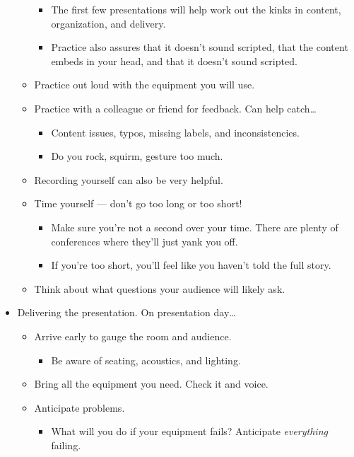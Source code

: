 \documentclass[../notes.tex]{subfiles}
\begin{document}
\begin{itemize}
\begin{itemize}
\begin{itemize}
            \item The first few presentations will help work out the kinks in content, organization, and delivery.
            \item Practice also assures that it doesn't sound scripted, that the content embeds in your head, and that it doesn't sound scripted.
        \end{itemize}
        \item Practice out loud with the equipment you will use.
        \item Practice with a colleague or friend for feedback. Can help catch\dots
        \begin{itemize}
            \item Content issues, typos, missing labels, and inconsistencies.
            \item Do you rock, squirm, gesture too much.
        \end{itemize}
        \item Recording yourself can also be very helpful.
        \item Time yourself --- don't go too long or too short!
        \begin{itemize}
            \item Make sure you're not a second over your time. There are plenty of conferences where they'll just yank you off.
            \item If you're too short, you'll feel like you haven't told the full story.
        \end{itemize}
        \item Think about what questions your audience will likely ask.
    \end{itemize}
    \item Delivering the presentation. On presentation day\dots
    \begin{itemize}
        \item Arrive early to gauge the room and audience.
        \begin{itemize}
            \item Be aware of seating, acoustics, and lighting.
        \end{itemize}
        \item Bring all the equipment you need. Check it and voice.
        \item Anticipate problems.
        \begin{itemize}
            \item What will you do if your equipment fails? Anticipate \emph{everything} failing.

\end{itemize}
\end{itemize}
\end{itemize}
\end{document}
